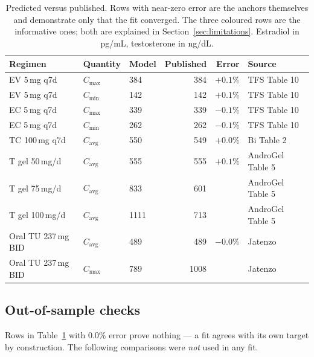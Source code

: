 \documentclass[11pt,a4paper]{article}
\newcommand{\bad}[1]{\obs{#1}}
\newcommand{\good}[1]{#1}
\begin{document}
\begin{table}[h]
\centering
\small
\begin{tabular}{@{}lllrrl@{}}
\toprule
\textbf{Regimen} & \textbf{Quantity} & \textbf{Model} & \textbf{Published}
                 & \textbf{Error} & \textbf{Source} \\
\midrule
EV 5\,mg q7d & $C_{\max}$ & 384 & 384 & \good{$+0.1\%$} & TFS Table 10 \\
EV 5\,mg q7d & $C_{\min}$ & 142 & 142 & \good{$+0.1\%$} & TFS Table 10 \\
EC 5\,mg q7d & $C_{\max}$ & 339 & 339 & \good{$-0.1\%$} & TFS Table 10 \\
EC 5\,mg q7d & $C_{\min}$ & 262 & 262 & \good{$-0.1\%$} & TFS Table 10 \\
TC 100\,mg q7d & $C_{\mathrm{avg}}$ & 550 & 549 & \good{$+0.0\%$} & Bi Table 2 \\
T gel 50\,mg/d & $C_{\mathrm{avg}}$ & 555 & 555 & \good{$+0.1\%$} & AndroGel Table 5 \\
T gel 75\,mg/d & $C_{\mathrm{avg}}$ & 833 & 601 & \bad{$+38.6\%$} & AndroGel Table 5 \\
T gel 100\,mg/d & $C_{\mathrm{avg}}$ & 1111 & 713 & \bad{$+55.8\%$} & AndroGel Table 5 \\
Oral TU 237\,mg BID & $C_{\mathrm{avg}}$ & 489 & 489 & \good{$-0.0\%$} & Jatenzo \\
Oral TU 237\,mg BID & $C_{\max}$ & 789 & 1008 & \bad{$-21.7\%$} & Jatenzo \\
\bottomrule
\end{tabular}
\caption{Predicted versus published. Rows with near-zero error are the anchors
themselves and demonstrate only that the fit converged. The three coloured rows
are the informative ones; both are explained in Section~\ref{sec:limitations}.
Estradiol in pg/mL, testosterone in ng/dL.}
\label{tab:accuracy}
\end{table}

\subsection{Out-of-sample checks}

Rows in Table~\ref{tab:accuracy} with 0.0\% error prove nothing --- a fit agrees
with its own target by construction. The following comparisons were \emph{not}
used in any fit.
\end{document}
